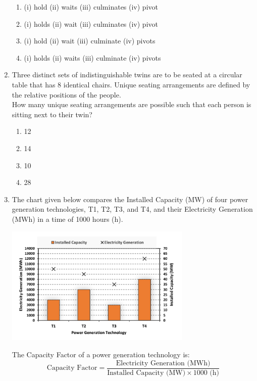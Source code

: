 \documentclass[journal,12pt,onecolumn]{exam}
\theoremstyle{remark}
\begin{document}
\begin{enumerate}
    \begin{enumerate}[label=\alph*)]
        \item (i) hold \quad (ii) waits \quad (iii) culminates \quad (iv) pivot
        \item (i) holds \quad (ii) wait \quad (iii) culminates \quad (iv) pivot
        \item (i) hold \quad (ii) wait \quad (iii) culminate \quad (iv) pivots
        \item (i) holds \quad (ii) waits \quad (iii) culminate \quad (iv) pivots
    \end{enumerate}

\item Three distinct sets of indistinguishable twins are to be seated at a circular table that has 8 identical chairs. Unique seating arrangements are defined by the relative positions of the people. \\
    How many unique seating arrangements are possible such that each person is sitting next to their twin?
    
    \begin{enumerate}[label=\alph*)]
        \item 12
        \item 14
        \item 10
        \item 28
    \end{enumerate}

 \item The chart given below compares the Installed Capacity (MW) of four power generation technologies, T1, T2, T3, and T4, and their Electricity Generation (MWh) in a time of 1000 hours (h).

    \begin{center}
        \includegraphics[width=0.7\textwidth]{figs/a3q8.png}
    \end{center}

    The Capacity Factor of a power generation technology is:
    \[
    \text{Capacity Factor} = \frac{\text{Electricity Generation (MWh)}}{\text{Installed Capacity (MW)} \times 1000 \text{ (h)}}
    \]


\end{enumerate}
\end{document}
